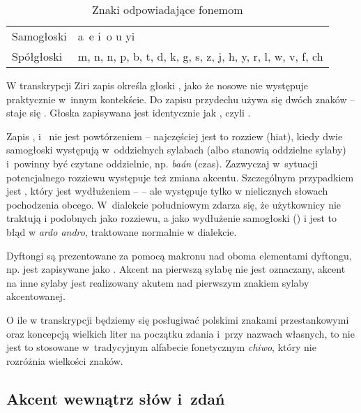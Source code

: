 \begin{spacing}{1.1}
    \begin{table}[ht]
        \centering
        \caption{Znaki odpowiadające fonemom}
        \begin{tabular}{ll} \toprule
            Samogłoski & a~e i~o u yi                                                \\
            Spółgłoski & m, n, n, p, b, t, d, k, g, s, z, j, h, y, r, l, w, v, f, ch \\\bottomrule
        \end{tabular}
        \label{tab:chars}
    \end{table}

    W transkrypcji Ziri zapis  określa głoski , jako że nosowe
     nie występuje praktycznie w~innym kontekście. Do zapisu przydechu używa
    się dwóch znaków --  staje się . Głoska  zapisywana jest
    identycznie jak , czyli .

    \skipline

    Zapis ,  i~ nie jest powtórzeniem -- najczęściej jest to
    rozziew (hiat), kiedy dwie samogłoski występują w~oddzielnych sylabach (albo
    stanowią oddzielne sylaby) i~powinny być czytane oddzielnie, np. \emph{baán}
     (czas). Zazwyczaj w~sytuacji potencjalnego rozziewu występuje też
    zmiana akcentu. Szczególnym przypadkiem jest , który jest wydłużeniem --
     -- ale występuje tylko w nielicznych słowach pochodzenia obcego.
    W~dialekcie południowym zdarza się, że użytkownicy nie traktują  i
    podobnych jako rozziewu, a jako wydłużenie samogłoski () i jest to błąd w
    \emph{ardo andro}, traktowane normalnie w dialekcie.

    Dyftongi są prezentowane za pomocą makronu nad oboma elementami dyftongu, np.
     jest zapisywane jako . Akcent na pierwszą sylabę nie jest
    oznaczany, akcent na inne sylaby jest realizowany akutem nad pierwszym znakiem
    sylaby akcentowanej.

    O ile w transkrypcji będziemy się posługiwać polskimi znakami przestankowymi
    oraz koncepcją wielkich liter na początku zdania i~przy nazwach własnych, to nie
    jest to stosowane w~tradycyjnym alfabecie fonetycznym \emph{chiwo}, który nie
    rozróżnia wielkości znaków.

    \subsection{Akcent wewnątrz słów i~zdań}


\end{spacing}
